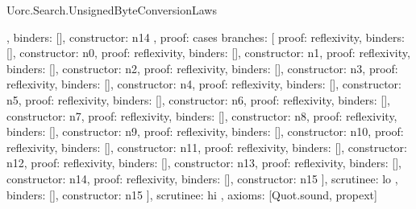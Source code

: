 \begin{lexlean}{Uorc.Search.UnsignedByteConversionLaws}
\begin{semanticmodule}
{{{{        },
        binders: [],
        constructor: n14
      },
      {
        proof: cases{
          branches: [
            {proof: reflexivity{}, binders: [], constructor: n0},
            {proof: reflexivity{}, binders: [], constructor: n1},
            {proof: reflexivity{}, binders: [], constructor: n2},
            {proof: reflexivity{}, binders: [], constructor: n3},
            {proof: reflexivity{}, binders: [], constructor: n4},
            {proof: reflexivity{}, binders: [], constructor: n5},
            {proof: reflexivity{}, binders: [], constructor: n6},
            {proof: reflexivity{}, binders: [], constructor: n7},
            {proof: reflexivity{}, binders: [], constructor: n8},
            {proof: reflexivity{}, binders: [], constructor: n9},
            {proof: reflexivity{}, binders: [], constructor: n10},
            {proof: reflexivity{}, binders: [], constructor: n11},
            {proof: reflexivity{}, binders: [], constructor: n12},
            {proof: reflexivity{}, binders: [], constructor: n13},
            {proof: reflexivity{}, binders: [], constructor: n14},
            {proof: reflexivity{}, binders: [], constructor: n15}
          ],
          scrutinee: lo
        },
        binders: [],
        constructor: n15
      }
    ],
    scrutinee: hi
  },
  axioms: [Quot.sound, propext]
}


\end{semanticmodule}
\end{lexlean}
